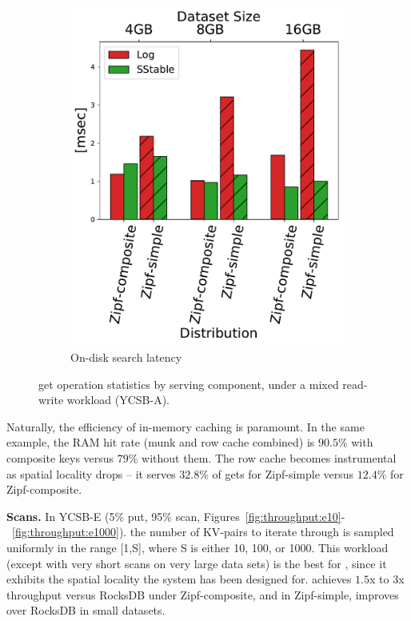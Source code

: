 \begin{figure}[htb]
\begin{subfigure}{0.49\linewidth}
\includegraphics[width=\textwidth]{figs/Latency_A.pdf}
\caption{On-disk search latency}
\label{fig:readstat:lat}
\end{subfigure}
\caption{{\sys\/ get operation statistics by serving component, under a mixed read-write workload (YCSB-A).}}
\label{fig:readstat}
\end{figure}

Naturally, the efficiency of in-memory caching is paramount. In the same example, the RAM hit rate 
(munk and row cache combined) is 
$90.5\%$ with composite keys versus $79\%$ without them. The row cache becomes instrumental as spatial locality drops --
 it serves $32.8\%$ of gets for Zipf-simple versus $12.4\%$ for Zipf-composite. 


{\bf Scans.} In YCSB-E (5\% put, 95\% scan, Figures~\ref{fig:throughput:e10}-~\ref{fig:throughput:e1000}).
the number of KV-pairs to iterate through is  
sampled uniformly in the range [1,S], where S is either 10, 100, or 1000. 
This workload (except with very short scans on very large data sets) is the best for \sys, since it exhibits the spatial locality the system has been designed for. 
\sys\/ achieves $1.5$x to $3$x throughput versus RocksDB under Zipf-composite, and in Zipf-simple, improves over RocksDB in small datasets. 
 
